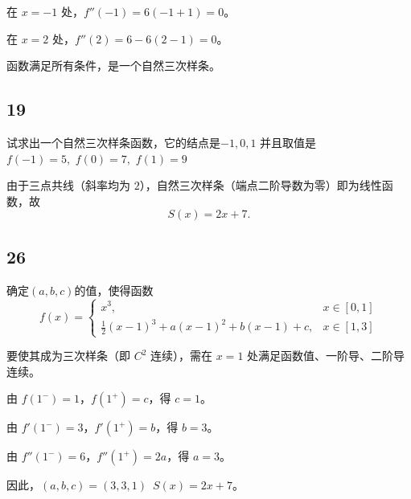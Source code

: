\documentclass{article}
\begin{document}
在 \(x = -1\) 处，\(f''(-1) = 6(-1+1) = 0\)。

在 \(x = 2\) 处，\(f''(2) = 6 - 6(2-1) = 0\)。

函数满足所有条件，是一个自然三次样条。

\subsection*{19}
试求出一个自然三次样条函数，它的结点是$-1,0,1$
并且取值是$f(-1)=5,\,\,f(0)=7,\,\,f(1)=9$

由于三点共线（斜率均为 \(2\)），自然三次样条（端点二阶导数为零）即为线性函数，故  
\[
S(x)=2x+7.
\]

\subsection*{26}
确定$(a,b,c)$的值，使得函数
\[
f(x)=\begin{cases}
x^3, & x\in[0,1] \\[2pt]
\frac{1}{2}(x-1)^3 + a(x-1)^2+b(x-1)+c, & x\in[1,3]
\end{cases}
\]

要使其成为三次样条（即 \(C^2\) 连续），需在 \(x=1\) 处满足函数值、一阶导、二阶导连续。

由 \(f(1^-)=1\)，\(f(1^+)=c\)，得 \(c=1\)。

由 \(f'(1^-)=3\)，\(f'(1^+)=b\)，得 \(b=3\)。

由 \(f''(1^-)=6\)，\(f''(1^+)=2a\)，得 \(a=3\)。

因此，\((a,b,c)=(3,3,1)\,\,\,S(x)=2x+7\)。
\end{document}
